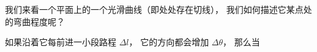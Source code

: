 

我们来看一个平面上的一个光滑曲线（即处处存在切线）， 我们如何描述它某点处的弯曲程度呢？

如果沿着它每前进一小段路程 $\Delta l$， 它的方向都会增加 $\Delta \theta$， 那么当

